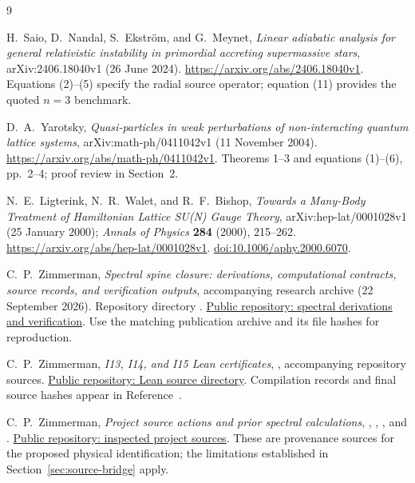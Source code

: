 \documentclass[11pt,letterpaper]{article}
\theoremstyle{definition}
\numberwithin{equation}{section}
\begin{document}
\begin{thebibliography}{9}

H.~Saio, D.~Nandal, S.~Ekstr\"om, and G.~Meynet,
\emph{Linear adiabatic analysis for general relativistic instability in
primordial accreting supermassive stars},
arXiv:2406.18040v1 (26 June 2024).
\url{https://arxiv.org/abs/2406.18040v1}.
Equations (2)--(5) specify the radial source operator; equation (11)
provides the quoted $n=3$ benchmark.

D.~A.~Yarotsky,
\emph{Quasi-particles in weak perturbations of non-interacting quantum
lattice systems}, arXiv:math-ph/0411042v1 (11 November 2004).
\url{https://arxiv.org/abs/math-ph/0411042v1}.
Theorems 1--3 and equations (1)--(6), pp.~2--4; proof review in Section~2.

N.~E.~Ligterink, N.~R.~Walet, and R.~F.~Bishop,
\emph{Towards a Many-Body Treatment of Hamiltonian Lattice SU(N) Gauge
Theory}, arXiv:hep-lat/0001028v1 (25 January 2000);
\emph{Annals of Physics} \textbf{284} (2000), 215--262.
\url{https://arxiv.org/abs/hep-lat/0001028v1}.
\href{https://doi.org/10.1006/aphy.2000.6070}{doi:10.1006/aphy.2000.6070}.

C.~P.~Zimmerman,
\emph{Spectral spine closure: derivations, computational contracts,
source records, and verification outputs}, accompanying research archive
(22 September 2026).
Repository directory
.
\href{https://github.com/carlzimmerman/zimmerman-formula/tree/main/real_research/reviews/spectral_spine_closure_2026_09_22}{Public repository: spectral derivations and verification}.
Use the matching publication archive and its file hashes for reproduction.

C.~P.~Zimmerman,
\emph{I13, I14, and I15 Lean certificates},
, accompanying repository sources.
\href{https://github.com/carlzimmerman/zimmerman-formula/tree/main/fable_independent_2026/lean_2026}{Public repository: Lean source directory}.
Compilation records and final source hashes appear in Reference~\cite{archive}.

C.~P.~Zimmerman,
\emph{Project source actions and prior spectral calculations},
,
,
, and
.
\href{https://github.com/carlzimmerman/zimmerman-formula/tree/main/deepseek_push}{Public repository: inspected project sources}.
These are provenance sources for the proposed physical identification;
the limitations established in Section~\ref{sec:source-bridge} apply.

\end{thebibliography}
\end{document}
